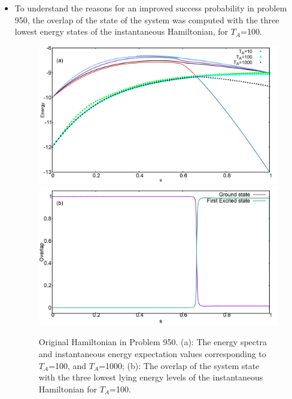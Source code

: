 \documentclass[../main.tex]{subfiles}
\begin{document}
\begin{itemize}
\item To understand the reasons for an improved success probability in problem 950, the overlap of the state of the system was computed with the three lowest energy states of the instantaneous Hamiltonian, for $T_A$=100. 

\begin{figure}
\centering
  \includegraphics[scale=0.24]{950a_s12_O.png}
  \includegraphics[scale=0.24]{950_Overlap_Orig.png}
  \caption{Original Hamiltonian in Problem 950. (a): The energy spectra and instantaneous energy expectation values corresponding to $T_A$=100, and $T_A$=1000; (b): The overlap of the system state with the three lowest lying energy levels of the instantaneous Hamiltonian for $T_A$=100.}
  \label{fig:a30}
 \end{figure}
 

\end{itemize}
\end{document}
